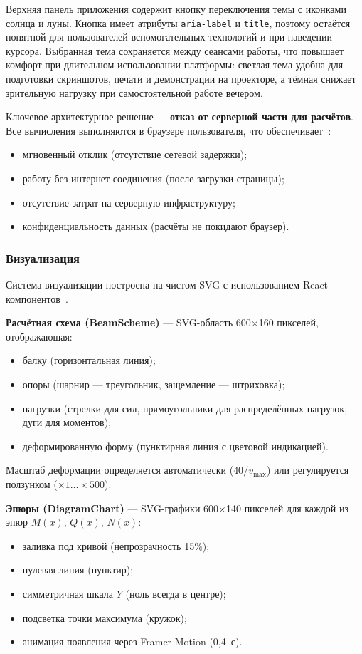 Верхняя панель приложения содержит кнопку переключения темы с иконками солнца и луны. Кнопка имеет атрибуты \texttt{aria-label} и \texttt{title}, поэтому остаётся понятной для пользователей вспомогательных технологий и при наведении курсора. Выбранная тема сохраняется между сеансами работы, что повышает комфорт при длительном использовании платформы: светлая тема удобна для подготовки скриншотов, печати и демонстрации на проекторе, а тёмная снижает зрительную нагрузку при самостоятельной работе вечером.

Ключевое архитектурное решение --- \textbf{отказ от серверной части для расчётов}. Все вычисления выполняются в браузере пользователя, что обеспечивает~\cite{flanagan2020}:
\begin{itemize}
  \item мгновенный отклик (отсутствие сетевой задержки);
  \item работу без интернет-соединения (после загрузки страницы);
  \item отсутствие затрат на серверную инфраструктуру;
  \item конфиденциальность данных (расчёты не покидают браузер).
\end{itemize}

\subsubsection{Визуализация}

Система визуализации построена на чистом SVG с использованием React-компонентов~\cite{bostock2011, boreskov}.

\textbf{Расчётная схема (BeamScheme)} --- SVG-область 600$\times$160 пикселей, отображающая:
\begin{itemize}
  \item балку (горизонтальная линия);
  \item опоры (шарнир --- треугольник, защемление --- штриховка);
  \item нагрузки (стрелки для сил, прямоугольники для распределённых нагрузок, дуги для моментов);
  \item деформированную форму (пунктирная линия с цветовой индикацией).
\end{itemize}

Масштаб деформации определяется автоматически ($40 / v_{\max}$) или регулируется ползунком ($\times 1 \ldots \times 500$).

\textbf{Эпюры (DiagramChart)} --- SVG-графики 600$\times$140 пикселей для каждой из эпюр $M(x)$, $Q(x)$, $N(x)$:
\begin{itemize}
  \item заливка под кривой (непрозрачность 15\%);
  \item нулевая линия (пунктир);
  \item симметричная шкала $Y$ (ноль всегда в центре);
  \item подсветка точки максимума (кружок);
  \item анимация появления через Framer Motion (0{,}4~с).
\end{itemize}

